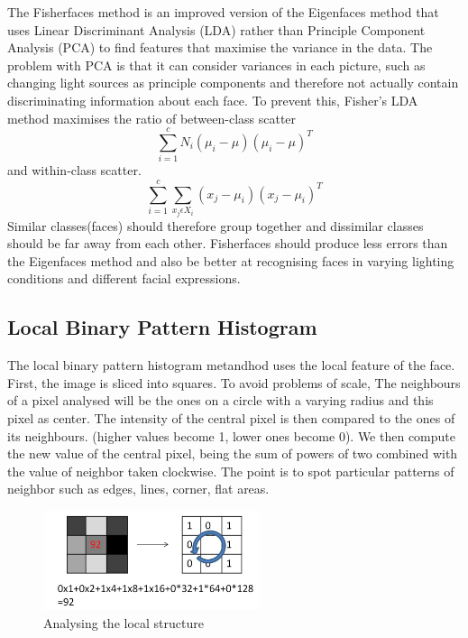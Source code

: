The Fisherfaces method is an improved version of the Eigenfaces method that uses Linear Discriminant Analysis (LDA) rather than Principle Component Analysis (PCA) to find features that maximise the variance in the data. The problem with PCA is that it can consider variances in each picture, such as changing light sources as principle components and therefore not actually contain discriminating information about each face. To prevent this, Fisher's LDA method maximises the ratio of between-class scatter 
\begin{equation}
\sum\limits_{i=1}^{c}N_{i}(\mu_{i}-\mu)(\mu_{i}-\mu)^T
\end{equation}
and within-class scatter.
\begin{equation}
\sum\limits_{i=1}^{c}\sum\limits_{x_{j}\epsilon X_{i}}^{}(x_{j}-\mu_{i})(x_{j}-\mu_{i})^T
\end{equation}
Similar classes(faces) should therefore group together and dissimilar classes should be far away from each other.
Fisherfaces should produce less errors than the Eigenfaces method and also be better at recognising faces in varying lighting conditions and different facial expressions.


\subsection{Local Binary Pattern Histogram}

The local binary pattern histogram metandhod uses the local feature of the face. First, the image is sliced into squares.
To avoid problems of scale, The neighbours of a pixel analysed will be the ones on a circle with a varying radius and this pixel as center.
The intensity of the central pixel is then compared to the ones of its neighbours. (higher values become 1, lower ones become 0).
We then compute the new value of the central pixel, being the sum of powers of two combined with the value of neighbor taken clockwise. The point is to spot particular patterns of neighbor such as edges, lines, corner, flat areas.

\begin{figure}[ht]
\centering
\includegraphics[width=2.5in]{rsrc/LBPH1.jpg}
\caption{Analysing the local structure}
\label{Local Structure}
\end{figure}

